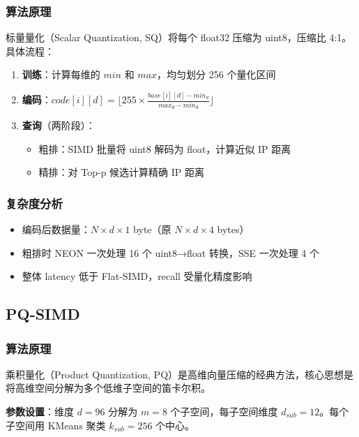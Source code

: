 \documentclass[a4paper]{article}
\begin{document}
\subsubsection{算法原理}

标量量化（Scalar Quantization, SQ）将每个 float32 压缩为 uint8，压缩比 4:1。具体流程：
\begin{enumerate}
  \item \textbf{训练}：计算每维的 $min$ 和 $max$，均匀划分 256 个量化区间
  \item \textbf{编码}：$code[i][d] = \lfloor 255 \times \frac{base[i][d] - min_d}{max_d - min_d} \rfloor$
  \item \textbf{查询}（两阶段）：
    \begin{itemize}
      \item 粗排：SIMD 批量将 uint8 解码为 float，计算近似 IP 距离
      \item 精排：对 Top-p 候选计算精确 IP 距离
    \end{itemize}
\end{enumerate}

\subsubsection{复杂度分析}

\begin{itemize}
  \item 编码后数据量：$N \times d \times 1$ byte（原 $N \times d \times 4$ bytes）
  \item 粗排时 NEON 一次处理 16 个 uint8→float 转换，SSE 一次处理 4 个
  \item 整体 latency 低于 Flat-SIMD，recall 受量化精度影响
\end{itemize}

\subsection{PQ-SIMD}

\subsubsection{算法原理}

乘积量化（Product Quantization, PQ）是高维向量压缩的经典方法，核心思想是将高维空间分解为多个低维子空间的笛卡尔积。

\textbf{参数设置}：维度 $d=96$ 分解为 $m=8$ 个子空间，每子空间维度 $d_{sub}=12$。每个子空间用 KMeans 聚类 $k_{sub}=256$ 个中心。
\end{document}
